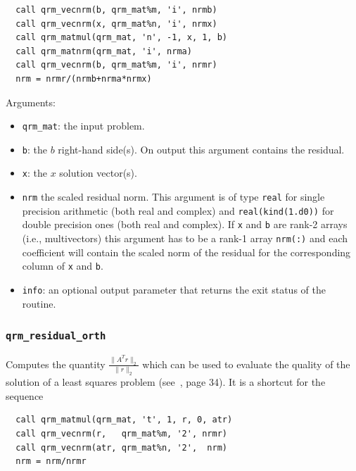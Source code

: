 \documentclass[11pt]{article}
\begin{document}
\begin{lstlisting}
  call qrm_vecnrm(b, qrm_mat%m, 'i', nrmb)
  call qrm_vecnrm(x, qrm_mat%n, 'i', nrmx)
  call qrm_matmul(qrm_mat, 'n', -1, x, 1, b)
  call qrm_matnrm(qrm_mat, 'i', nrma)
  call qrm_vecnrm(b, qrm_mat%m, 'i', nrmr)
  nrm = nrmr/(nrmb+nrma*nrmx)
\end{lstlisting}


\noindent Arguments:
\begin{itemize}
\item \texttt{qrm\_mat}: the input problem.
\item \texttt{b}: the $b$ right-hand side(s). On output this argument
  contains the residual.
\item \texttt{x}: the $x$ solution vector(s).
\item \texttt{nrm} the scaled residual norm. This argument is of type
  \texttt{real} for single precision arithmetic (both real and
  complex) and \texttt{real(kind(1.d0))} for double precision ones
  (both real and complex). If \texttt{x} and \texttt{b} are rank-2
  arrays (i.e., multivectors) this argument has to be a rank-1 array
  \texttt{nrm(:)} and each coefficient will contain the scaled norm of
  the residual for the corresponding column of \texttt{x} and
  \texttt{b}.
\item \texttt{info}: an optional output parameter that returns the
  exit status of the routine.
\end{itemize}



\subsubsection{\texttt{qrm\_residual\_orth}}
Computes the quantity $\frac{\|A^Tr\|_2}{\|r\|_2}$ which can be used
to evaluate the quality of the solution of a least squares problem
(see~\cite{bjor:96}, page 34).
It is a shortcut for the sequence

\begin{lstlisting}
  call qrm_matmul(qrm_mat, 't', 1, r, 0, atr)
  call qrm_vecnrm(r,   qrm_mat%m, '2', nrmr)
  call qrm_vecnrm(atr, qrm_mat%n, '2',  nrm)
  nrm = nrm/nrmr
\end{lstlisting}
%
\end{document}

